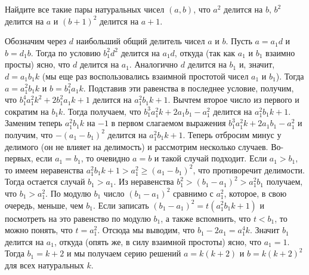 Найдите все такие пары натуральных чисел $(a, b)$, что
$a^2$ делится на $b$,
$b^2$ делится на $a$
и $(b + 1)^2$ делится на $a + 1$.

\solution
Обозначим через $d$ наибольший общий делитель чисел $a$ и $b$.
Пусть $a = a_1 d$ и $b = d_1 b$.
Тогда по условию $b_1^2 d^2$ делится на $a_1 d$, откуда
(так как $a_1$ и $b_1$ взаимно просты)
ясно, что $d$ делится на $a_1$.
Аналогично $d$ делится на $b_1$ и, значит, $d = a_1 b_1 k$
(мы еще раз воспользовались взаимной простотой чисел $a_1$ и $b_1$).
Тогда $a = a_1^2 b_1 k$ и $b = b_1^2 a_1 k$.
Подставив эти равенства в последнее условие, получим, что
$b_1^4 a_1^2 k^2 + 2 b_1^2 a_1 k + 1$
делится на $a_1^2 b_1 k + 1$.
Вычтем второе число из первого и сократим на $b_1 k$.
Тогда получаем, что
$b_1^3 a_1^2 k + 2 a_1 b_1 - a_1^2$
делится на $a_1^2 b_1 k + 1$.
Заменим теперь $a_1^2 b_1 k$ на $-1$ в первом слагаемом выражения
$b_1^3 a_1^2 k + 2 a_1 b_1 - a_1^2$ и получим, что $-(a_1 - b_1)^2$ делится на
$a_1^2 b_1 k + 1$.
Теперь отбросим минус у делимого (он не влияет на делимость) и рассмотрим
несколько случаев.
Во-первых, если $a_1 = b_1$, то очевидно $a = b$ и такой случай подходит.
Если $a_1 > b_1$, то имеем неравенства
$a_1^2 b_1 k + 1 > a_1^2 \geq (a_1 - b_1)^2$,
что противоречит делимости.
Тогда остается случай $b_1 > a_1$.
Из неравенства
$b_1^2 > (b_1 - a_1)^2 > a_1^2 b_1$
получаем, что $b_1 > a_1^2$.
По модулю $b_1$ число $(b_1 - a_1)^2$ сравнимо с $a_1^2$,
которое, в свою очередь, меньше, чем $b_1$.
Если записать
$(b_1 - a_1)^2 = t (a_1^2 b_1 k+1)$ и посмотреть на это равенство
по модулю $b_1$, а также вспомнить, что $t < b_1$, то можно понять, что
$t = a_1^2$.
Отсюда мы выводим, что $b_1 - 2 a_1 = a_1^4 k$.
Значит $b_1$ делится на $a_1$, откуда (опять же, в силу взаимной простоты)
ясно, что $a_1 = 1$.
Тогда $b_1 = k + 2$ и мы получаем серию решений
$a = k (k + 2)$ и $b = k (k + 2)^2$ для всех натуральных $k$. 

